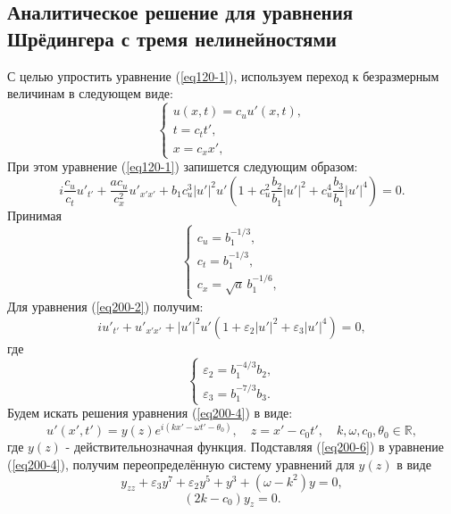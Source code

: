 \documentclass[14pt,a4paper]{extreport}
\begin{document}
		\subsection{Аналитическое решение для уравнения Шрёдингера с тремя нелинейностями}\label{ch210}
			С целью упростить уравнение (\ref{eq120-1}), используем переход к безразмерным величинам в следующем виде:
			\begin{equation} \label{eq200-1}
				\begin{cases}
				u(x,t)=c_{u} u'(x,t),\\
				t=c_{t} t',\\
				x=c_{x}x',
				\end{cases}
			\end{equation}
			При этом уравнение (\ref{eq120-1}) запишется следующим образом:
			\begin{equation}\label{eq200-2}
				i\frac{c_{u}}{c_{t}}u'_{t'}+\frac{a c_{u}}{c_{x}^{2}}u'_{x'x'}+b_{1}c_{u}^{3}|u'|^2 u'\left(1+c_{u}^{2}\frac{b_{2}}{b_{1}}|u'|^2+c_{u}^{4}\frac{b_{3}}{b_{1}}|u'|^4\right)=0.
			\end{equation}
			Принимая
			\begin{equation} \label{eq200-3}
				\begin{cases}
				c_{u} = b_{1}^{-1/3},\\
				c_{t} = b_{1}^{-1/3},\\
				c_{x} = \sqrt{a} \,b_{1}^{-1/6},
				\end{cases}
			\end{equation}
			Для уравнения (\ref{eq200-2}) получим:
			\begin{equation}\label{eq200-4}
				iu'_{t'}+u'_{x'x'}+|u'|^2 u'\left(1+\varepsilon_{2}|u'|^2+\varepsilon_{3}|u'|^4\right)=0,
			\end{equation}
			где
			\begin{equation} \label{eq200-5}
				\begin{cases}
				\varepsilon_{2}=b_{1}^{-4/3}b_{2},\\
				\varepsilon_{3}=b_{1}^{-7/3}b_{3}.
				\end{cases}
			\end{equation}
			Будем искать решения уравнения (\ref{eq200-4}) в виде:
			\begin{equation}\label{eq200-6}
				u'(x',t')=y(z)e^{i(kx'-\omega t'-\theta_{0})}, \quad z=x'-c_{0}t',\quad k,\omega,c_{0},\theta_{0} \in \mathbb{R},
			\end{equation}
			где \(y(z)\) - действительнозначная функция. Подставляя (\ref{eq200-6}) в уравнение (\ref{eq200-4}), получим переопределённую систему уравнений для \(y(z)\) в виде
			\begin{equation} \label{eq200-7}
				y_{zz}+\varepsilon_{3} y^{7} +\varepsilon_{2} y^{5} + y^{3}+\left(\omega-k^{2}\right) y=0,
			\end{equation}
			\begin{equation} \label{eq200-8}
				(2 k-c_{0})y_{z}=0.
			\end{equation}
\end{document}
